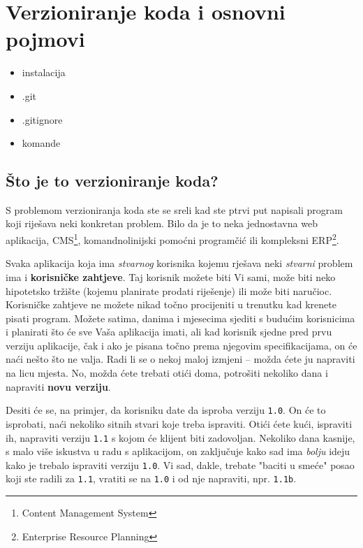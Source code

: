 \chapter*{Verzioniranje koda i osnovni pojmovi}

\begin{itemize}
   \item instalacija
   \item .git
   \item .gitignore
   \item komande
\end{itemize}

\section*{Što je to verzioniranje koda?}

S problemom verzioniranja koda ste se sreli kad ste ptrvi put napisali program koji riješava neki konkretan problem. 
Bilo da je to neka jednostavna web aplikacija, CMS\footnote{Content Management System}, komandnolinijski pomoćni programčić ili kompleksni ERP\footnote{Enterprise Resource Planning}.

Svaka aplikacija koja ima \textit{stvarnog} korisnika kojemu rješava neki \textit{stvarni} problem ima i \textbf{korisničke zahtjeve}.
Taj korisnik možete biti Vi sami, može biti neko hipotetsko tržište (kojemu planirate prodati riješenje) ili može biti naručioc.
Korisničke zahtjeve ne možete nikad točno procijeniti u trenutku kad krenete pisati program.
Možete satima, danima i mjesecima sjediti s budućim korisnicima i planirati što će sve Vaša aplikacija imati, ali kad korisnik sjedne pred prvu verziju aplikacije, čak i ako je pisana točno prema njegovim specifikacijama, on će naći nešto što ne valja. 
Radi li se o nekoj maloj izmjeni -- možda ćete ju napraviti na licu mjesta. No, možda ćete trebati otići doma, potrošiti nekoliko dana i napraviti \textbf{novu verziju}.

Desiti će se, na primjer, da korisniku date da isproba verziju \texttt{1.0}.
On će to isprobati, naći nekoliko sitnih stvari koje treba ispraviti.
Otići ćete kući, ispraviti ih, napraviti verziju \texttt{1.1} s kojom će klijent biti zadovoljan.
Nekoliko dana kasnije, s malo više iskustva u radu s aplikacijom, on zaključuje kako sad ima \textit{bolju} ideju kako je trebalo ispraviti verziju \texttt{1.0}.
Vi sad, dakle, trebate "baciti u smeće" posao koji ste radili za \texttt{1.1}, vratiti se na \texttt{1.0} i od nje napraviti, npr. \texttt{1.1b}.

